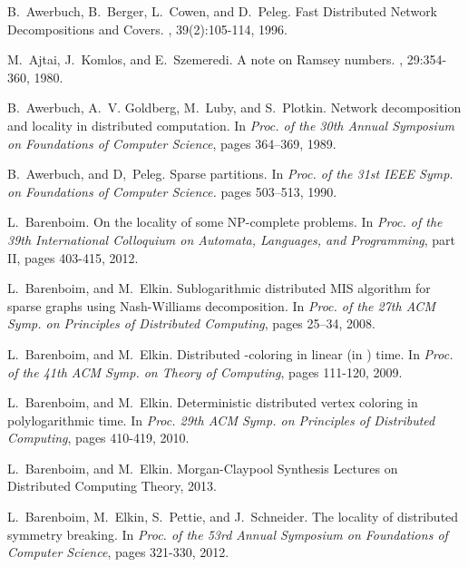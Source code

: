 \documentclass[11pt]{article}
\begin{document}
\begin{thebibliography}{10}

B.~Awerbuch, B.~Berger, L.~Cowen, and D.~Peleg.
\newblock  Fast Distributed Network Decompositions and Covers.
, 39(2):105-114, 1996.

M.~Ajtai, J.~Komlos, and E.~Szemeredi.
\newblock A note on Ramsey numbers.
, 29:354-360, 1980.







B.~Awerbuch, A.~V. Goldberg, M.~Luby, and S.~Plotkin.
\newblock Network decomposition and locality in distributed computation.
\newblock In {\em Proc. of the 30th Annual Symposium on Foundations of Computer Science}, pages 364--369, 1989.

B.~Awerbuch, and D,~Peleg.
\newblock Sparse partitions.
\newblock In {\em Proc. of the 31st IEEE Symp. on Foundations of Computer Science.} pages  503–513, 1990.

L.~Barenboim.
\newblock On the locality of some NP-complete problems.
\newblock In {\em Proc. of the 39th International Colloquium on Automata, Languages, and Programming}, part II, pages 403-415, 2012.

L.~Barenboim, and M.~Elkin.
\newblock Sublogarithmic distributed MIS algorithm for sparse graphs using Nash-Williams decomposition.
\newblock In {\em Proc. of the 27th ACM Symp. on Principles of Distributed Computing}, pages 25--34, 2008.

L.~Barenboim, and M.~Elkin.
\newblock Distributed -coloring in linear (in ) time.
\newblock In {\em Proc. of the 41th ACM Symp. on Theory of Computing}, pages 111-120, 2009.

L.~Barenboim, and M.~Elkin.
\newblock Deterministic distributed vertex coloring in polylogarithmic time.
\newblock In {\em Proc. 29th ACM Symp. on Principles of Distributed Computing}, pages 410-419,  2010.


L.~Barenboim, and M.~Elkin.
\newblock Morgan-Claypool Synthesis Lectures on Distributed Computing Theory, 2013.

L.~Barenboim, M.~Elkin, S.~Pettie, and J.~Schneider.
\newblock The locality of distributed symmetry breaking.
\newblock In {\em Proc. of the 53rd Annual Symposium on Foundations of Computer Science}, pages 321-330, 2012.




\end{thebibliography}
\end{document}
